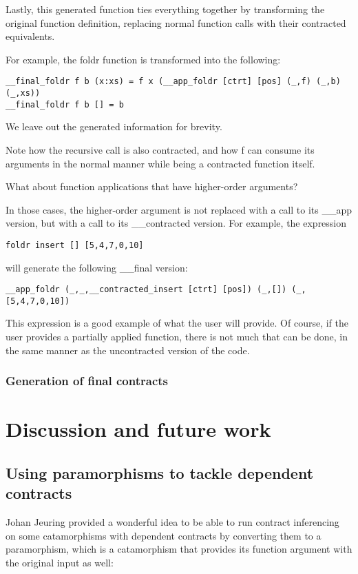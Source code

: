 \documentclass[10pt]{report}
\begin{document}
Lastly, this generated function ties everything together by transforming the original function definition, replacing normal function calls with their contracted equivalents.

For example, the foldr function is transformed into the following:

\begin{lstlisting}
__final_foldr f b (x:xs) = f x (__app_foldr [ctrt] [pos] (_,f) (_,b) (_,xs))
__final_foldr f b [] = b
\end{lstlisting}

We leave out the generated information for brevity.

Note how the recursive call is also contracted, and how f can consume its arguments in the normal manner while being a contracted function itself.

What about function applications that have higher-order arguments?

In those cases, the higher-order argument is not replaced with a call to its \_\_app version, but with a call to its \_\_contracted version.
For example, the expression

\begin{lstlisting}
foldr insert [] [5,4,7,0,10]
\end{lstlisting}

will generate the following \_\_final version:

\begin{lstlisting}
__app_foldr (_,_,__contracted_insert [ctrt] [pos]) (_,[]) (_,[5,4,7,0,10])
\end{lstlisting}

This expression is a good example of what the user will provide.
Of course, if the user provides a partially applied function, there is not much that can be done, in the same manner as the uncontracted version of the code.

\subsection{Generation of final contracts}

\chapter{Discussion and future work}
\label{futurework}

\section{Using paramorphisms to tackle dependent contracts}
Johan Jeuring provided a wonderful idea to be able to run contract inferencing on some catamorphisms with dependent contracts by converting them to a paramorphism, which is a catamorphism that provides its function argument with the original input as well:
\end{document}
